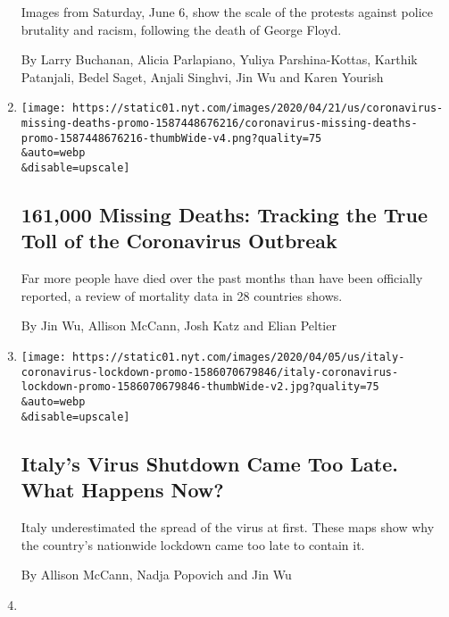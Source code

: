 \begin{enumerate}
  Images from Saturday, June 6, show the scale of the protests against
  police brutality and racism, following the death of George Floyd.

  By Larry Buchanan, Alicia Parlapiano, Yuliya Parshina-Kottas, Karthik
  Patanjali, Bedel Saget, Anjali Singhvi, Jin Wu and Karen Yourish
\item
  \href{/interactive/2020/04/21/world/coronavirus-missing-deaths.html}{}

  \texttt{[image: https://static01.nyt.com/images/2020/04/21/us/coronavirus-missing-deaths-promo-1587448676216/coronavirus-missing-deaths-promo-1587448676216-thumbWide-v4.png?quality=75\\\&auto=webp\\\&disable=upscale]}

  \hypertarget{161000-missing-deaths-tracking-the-true-toll-of-the-coronavirus-outbreak}{%
  \subsection{161,000 Missing Deaths: Tracking the True Toll of the
  Coronavirus
  Outbreak}\label{161000-missing-deaths-tracking-the-true-toll-of-the-coronavirus-outbreak}}

  Far more people have died over the past months than have been
  officially reported, a review of mortality data in 28 countries shows.

  By Jin Wu, Allison McCann, Josh Katz and Elian Peltier
\item
  \href{/interactive/2020/04/05/world/europe/italy-coronavirus-lockdown-reopen.html}{}

  \texttt{[image: https://static01.nyt.com/images/2020/04/05/us/italy-coronavirus-lockdown-promo-1586070679846/italy-coronavirus-lockdown-promo-1586070679846-thumbWide-v2.jpg?quality=75\\\&auto=webp\\\&disable=upscale]}

  \hypertarget{italys-virus-shutdown-came-too-late-what-happens-now}{%
  \subsection{Italy's Virus Shutdown Came Too Late. What Happens
  Now?}\label{italys-virus-shutdown-came-too-late-what-happens-now}}

  Italy underestimated the spread of the virus at first. These maps show
  why the country's nationwide lockdown came too late to contain it.

  By Allison McCann, Nadja Popovich and Jin Wu
\item
  \href{/interactive/2020/03/22/world/coronavirus-spread.html}{}


\end{enumerate}
